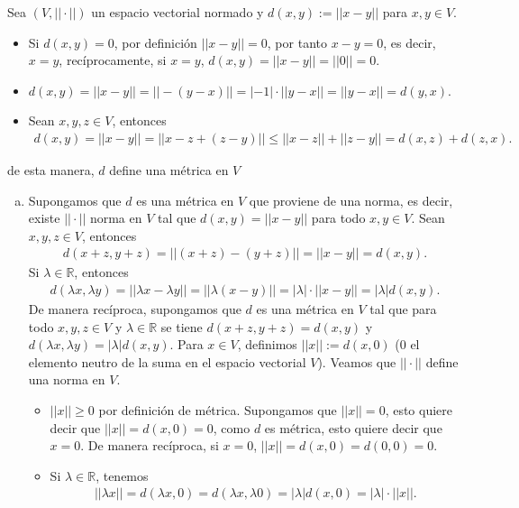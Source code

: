\begin{itemize}[leftmargin=*]
        \begin{solution}
            Sea $(V,||\cdot||)$ un espacio vectorial normado y $d(x,y):=||x-y||$ para $x,y \in V$.
            \begin{itemize}
                \item Si $d(x,y)=0$, por definición $||x-y||=0$, por tanto $x-y=0$, es decir, $x=y$, recíprocamente, si $x=y$, $d(x,y)=||x-y||=||0||=0$.
                \item $d(x,y)=||x-y||=||-(y-x)||=|-1|\cdot||y-x||=||y-x||=d(y,x)$.
                \item Sean $x,y,z \in V$, entonces
                \begin{align*}
                    d(x,y)=||x-y||=||x-z+(z-y)||\leq ||x-z||+||z-y||=d(x,z)+d(z,x).
                \end{align*}
            \end{itemize}
            de esta manera, $d$ define una métrica en $V$
            \begin{enumerate}[(a)]
                \item Supongamos que $d$ es una métrica en $V$ que proviene de una norma, es decir, existe $||\cdot||$ norma en $V$ tal que $d(x,y)=||x-y||$ para todo $x,y \in V$. Sean $x,y,z \in V$, entonces
                \begin{align*}
                    d(x+z,y+z)=||(x+z)-(y+z)||=||x-y||=d(x,y).
                \end{align*}
                Si $\lambda \in \mathbb{R}$, entonces
                \begin{align*}
                    d(\lambda x,\lambda y)=||\lambda x-\lambda y||=||\lambda(x-y)||=|\lambda|\cdot||x-y||=|\lambda|d(x,y).
                \end{align*}
                De manera recíproca, supongamos que $d$ es una métrica en $V$ tal que para todo $x,y,z \in V$ y $\lambda \in \mathbb{R}$ se tiene $d(x+z,y+z)=d(x,y)$ y $d(\lambda x,\lambda y)=|\lambda|d(x,y)$. Para $x \in V$, definimos $||x||:=d(x,0)$ ($0$ el elemento neutro de la suma en el espacio vectorial $V$). Veamos que $||\cdot||$ define una norma en $V$.
                \begin{itemize}
                    \item $||x||\geq 0$ por definición de métrica. Supongamos que $||x||=0$, esto quiere decir que $||x||=d(x,0)=0$, como $d$ es métrica, esto quiere decir que $x=0$. De manera recíproca, si $x=0$, $||x||=d(x,0)=d(0,0)=0$.

                    \item Si $\lambda\in \mathbb{R}$, tenemos 
                    \begin{align*}
                        ||\lambda x||=d(\lambda x,0)=d(\lambda x,\lambda 0)=|\lambda|d(x,0)=|\lambda|\cdot ||x||.
                    \end{align*}


\end{itemize}
\end{enumerate}
\end{solution}
\end{itemize}
